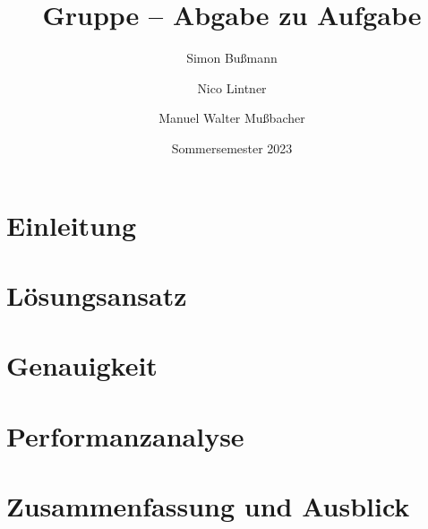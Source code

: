 \documentclass[course=erap]{aspdoc}
\author{Simon Bußmann \and Nico Lintner \and Manuel Walter Mußbacher}
\date{Sommersemester 2023}
\title{Gruppe \theGroup{} -- Abgabe zu Aufgabe \theNumber}
\begin{document}
\maketitle

\section{Einleitung}


\section{Lösungsansatz}


\section{Genauigkeit}


\section{Performanzanalyse}


\section{Zusammenfassung und Ausblick}


{}
\end{document}
